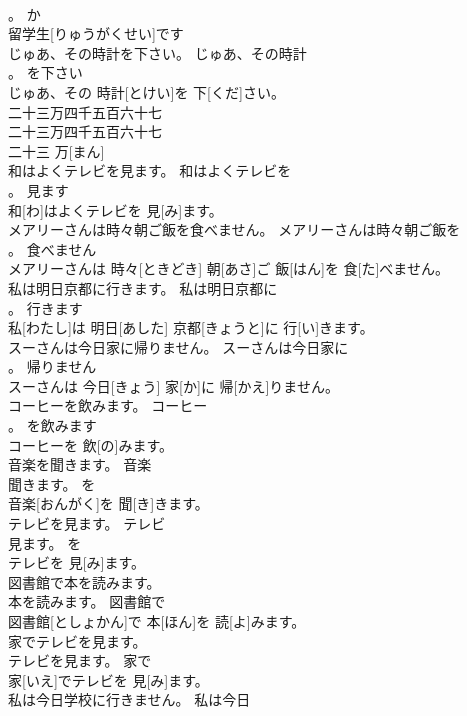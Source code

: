 \documentclass[8pt]{extreport}
\begin{document}
\begin{CJK}{UTF8}{min}
\\	。	か	
\\	留学生[りゅうがくせい]です
\\	じゅあ、その時計を下さい。	じゅあ、その時計
\\	。	を下さい	
\\	じゅあ、その 時計[とけい]を 下[くだ]さい。	
\\	二十三万四千五百六十七	
\\	二十三万四千五百六十七	
\\	二十三 万[まん]	
\\	和はよくテレビを見ます。	和はよくテレビを
\\	。	見ます	
\\	和[わ]はよくテレビを 見[み]ます。	
\\	メアリーさんは時々朝ご飯を食べません。	メアリーさんは時々朝ご飯を
\\	。	食べません	
\\	メアリーさんは 時々[ときどき] 朝[あさ]ご 飯[はん]を 食[た]べません。	
\\	私は明日京都に行きます。	私は明日京都に
\\	。	行きます	
\\	私[わたし]は 明日[あした] 京都[きょうと]に 行[い]きます。	
\\	スーさんは今日家に帰りません。	スーさんは今日家に
\\	。	帰りません	
\\	スーさんは 今日[きょう] 家[か]に 帰[かえ]りません。	
\\	コーヒーを飲みます。	コーヒー
\\	。	を飲みます	
\\	コーヒーを 飲[の]みます。	
\\	音楽を聞きます。	音楽
\\	聞きます。	を	
\\	音楽[おんがく]を 聞[き]きます。	
\\	テレビを見ます。	テレビ
\\	見ます。	を	
\\	テレビを 見[み]ます。	
\\	図書館で本を読みます。	
\\	本を読みます。	図書館で	
\\	図書館[としょかん]で 本[ほん]を 読[よ]みます。	
\\	家でテレビを見ます。	
\\	テレビを見ます。	家で	
\\	家[いえ]でテレビを 見[み]ます。	
\\	私は今日学校に行きません。	私は今日

\end{CJK}
\end{document}
